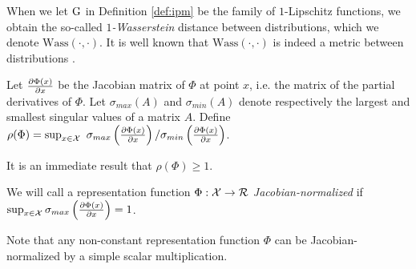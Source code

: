 When we let $\mathrm{G}$ in Definition \ref{def:ipm} be the family of $1$-Lipschitz functions, we obtain the so-called \emph{$1$-Wasserstein} distance between distributions, which we denote $\text{Wass}(\cdot,\cdot)$.
It is well known that $\text{Wass}(\cdot,\cdot)$ is indeed a metric between distributions \cite{villani2008optimal}.




\begin{thmappdef}\label{def:rcondA}
Let $\frac{\partial \Phi (x)}{\partial x}$ be the Jacobian matrix of $\Phi$ at point $x$, i.e. the matrix of the partial derivatives of $\Phi$. Let $\sigma_{max}(A)$ and $\sigma_{min}(A)$ denote respectively the largest and smallest singular values of a matrix $A$.
Define $\rho(\Phi) = \sup_{x \in \mathcal X} \, \, \sigma_{max}\left(\frac{\partial \Phi (x)}{\partial x}\right) / \sigma_{min}\left(\frac{\partial \Phi (x)}{\partial x}\right)$.
\end{thmappdef}
It is an immediate result that $\rho(\Phi) \geq 1$.

\begin{thmappdef}
We will call a representation function $\Phi : \mathcal X \rightarrow \mathcal{R}$ \emph{Jacobian-normalized} if $\sup_{x \in \mathcal X} \sigma_{max} \left(\frac{\partial \Phi (x)}{\partial x} \right) = 1$.
\end{thmappdef}
Note that any non-constant representation function $\Phi$ can be Jacobian-normalized by a simple scalar multiplication.


